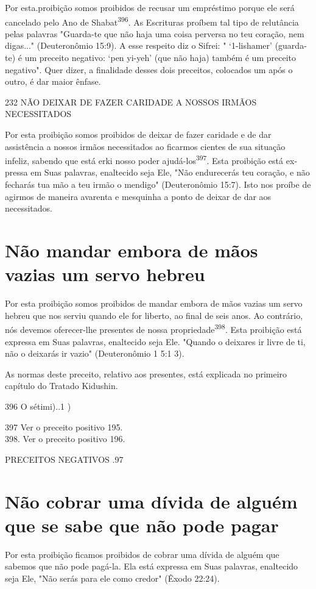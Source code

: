 \begin{itemize}
\begin{enumrate}
\begin{itemize}
\begin{itemize}
\begin{itemize}
Por esta.proibição somos proibidos de recusar um empréstimo por­que ele
será cancelado pelo Ano de Shabat\textsuperscript{396}. As Escrituras
proíbem tal tipo de relutância pelas palavras "Guarda-te que não haja
uma coisa perversa no teu coração, nem digas..." (Deuteronômio 15:9). A
esse respeito diz o Sifrei: " `1-lis­hamer' (guarda-te) é um preceito
negativo: `pen yi-yeh' (que não haja) também é um preceito negativo".
Quer dizer, a finalidade desses dois preceitos, coloca­dos um após o
outro, é dar maior ênfase.

232 NÃO DEIXAR DE FAZER CARIDADE A NOSSOS IRMÃOS NECESSITADOS

Por esta proibição somos proibidos de deixar de fazer caridade e de dar
assistência a nossos irmãos necessitados ao ficarmos cientes de sua
situação infeliz, sabendo que está erki nosso poder
ajudá-los\textsuperscript{397}. Esta proibição está ex­pressa em Suas
palavras, enaltecido seja Ele, "Não endurecerás teu coração, e não
fecharás tua mão a teu irmão o mendigo" (Deuteronômio 15:7). Isto nos
proíbe de agirmos de maneira avarenta e mesquinha a ponto de deixar de
dar aos necessitados.

\section{Não mandar embora de mãos vazias um servo hebreu}

Por esta proibição somos proibidos de mandar embora de mãos va­zias um
servo hebreu que nos serviu quando ele for liberto, ao final de seis
anos. Ao contrário, nós devemos oferecer-lhe presentes de nossa
propriedade\textsuperscript{398}. Es­ta proibição está expressa em Suas
palavras, enaltecido seja Ele. "Quando o dei­xares ir livre de ti, não o
deixarás ir vazio" (Deuteronômio 1 5:1 3).

As normas deste preceito, relativo aos presentes, está explicada no
primeiro capítulo do Tratado Kidushin.

396 O sétimi)..1 )


397 Ver o preceito positivo 195.\\
398. Ver o preceito positivo 196.


PRECEITOS NEGATIVOS .97

\section{Não cobrar uma dívida de alguém que se sabe que não pode pagar}

Por esta proibição ficamos proibidos de cobrar uma dívida de alguém que
sabemos que não pode pagá-la. Ela está expressa em Suas palavras,
enalte­cido seja Ele, "Não serás para ele como credor" (Êxodo 22:24).


\end{itemize}
\end{itemize}
\end{itemize}
\end{enumrate}
\end{itemize}
